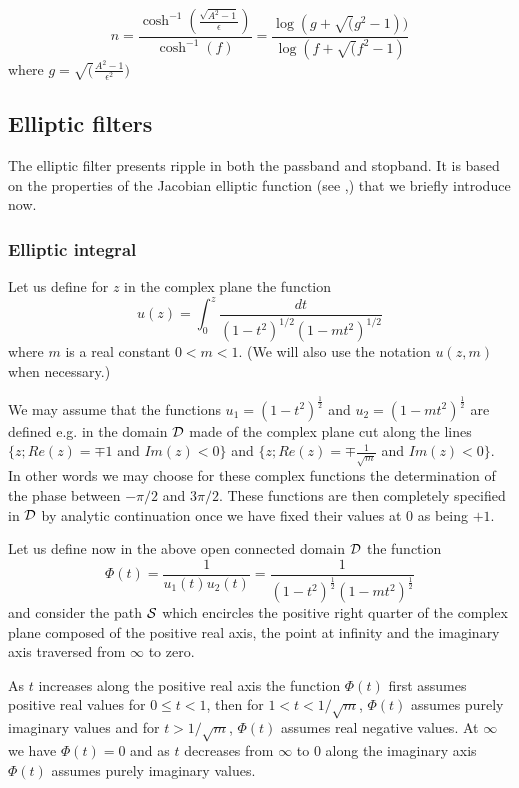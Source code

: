 $$n=\frac{\cosh^{-1}(\frac{\sqrt{A^2-1}}{\epsilon})}{\cosh^{-1}(f)} = \frac{\log(g+\sqrt(g^2-1))}{\log(f+\sqrt(f^2-1)}$$
where $g = \sqrt(\frac{A^2-1}{\epsilon^2})$

\subsection{Elliptic filters}
The elliptic filter presents ripple in both the passband and stopband.
It is based on the properties of the Jacobian elliptic function (see \cite{dieu},\cite{Abram}) that we briefly introduce now.
\subsubsection{Elliptic integral}
Let us define for $z$ in the complex plane the function 
\begin{equation}
u(z)=\int_{0}^{z}{\frac{dt}{{(1-t^2)}^{1/2}{(1-m t^2)}^{1/2}}}
\label{ellint}
\end{equation}
where $m$ is a real constant \( 0 < m < 1 \).
(We will also use the notation $u(z,m)$ when necessary.)


We may assume that the functions $u_{1}={(1-t^2)}^{\frac{1}{2}}$ and $u_{2}={(1-m t^2)}^{\frac{1}{2}}$ are defined e.g. in the domain ${\cal D}$ made of the complex plane cut along the lines \( \{z;Re(z)=\mp 1 \) and  \(Im(z) < 0 \} \) and \( \{z;Re(z)=\mp \frac{1}{\sqrt{m}} \) and \(Im(z) < 0 \} \).
In other words we may choose for these complex functions the determination of the phase between $-\pi/2$ and $3 \pi/2$.
These functions are then completely specified in ${\cal D}$ by analytic continuation once we have fixed their values at $0$ as being $+1$.

Let us define now in the above open connected domain ${\cal D}$ the function
$$\Phi(t)=\frac{1}{u_{1}(t) u_{2}(t)}=\frac{1}{{(1-t^2)}^{\frac{1}{2}}{(1-m t^2)}^{\frac{1}{2}}}$$
and consider the path ${\cal S}$ which encircles the positive right quarter of the complex plane composed of the positive real axis, the point at infinity and the imaginary axis traversed from ${\infty}$ to zero.

As $t$ increases along the positive real axis the function $\Phi(t)$ first assumes positive real values for $0 \leq t <1$, then for $1 < t < 1/{\sqrt{m}}$, $\Phi(t)$ assumes purely imaginary values and for $t > 1/{\sqrt{m}}$, $\Phi(t)$ assumes real negative values.
At $\infty$ we have $\Phi(t)=0$ and as $t$ decreases from $\infty$ to $0$ along the imaginary axis $\Phi(t)$ assumes purely imaginary values.

